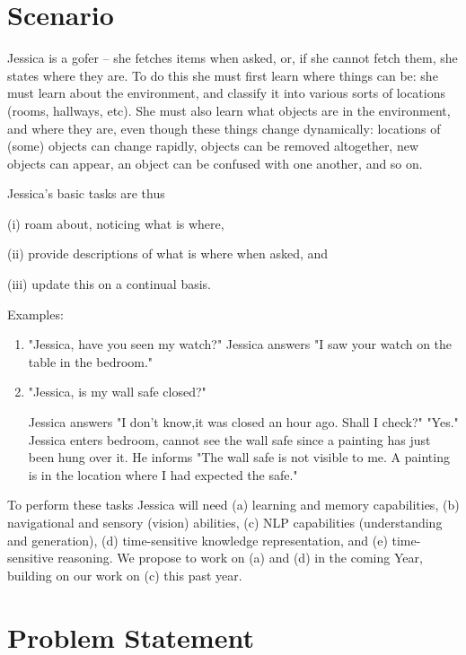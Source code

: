 \documentclass[12pt]{amsart}
\begin{document}
\section{Scenario}

Jessica is a gofer -- she fetches items when asked, or, if she
cannot fetch them, she states where they are. To do this she
must first learn where things can be: she must learn about the
environment, and classify it into various sorts of locations
(rooms, hallways, etc). She must also learn what objects are
in the environment, and where they are, even though these things
change dynamically: locations of (some) objects can change
rapidly, objects can be removed altogether, new objects can
appear, an object can be confused with one another, and so on.

Jessica's basic tasks are thus 

(i) roam about, noticing what is where,

(ii) provide descriptions of what is where when asked, and 

(iii) update this on a continual basis.

\medskip

\noindent
Examples:
\begin{enumerate}
\item
  "Jessica, have you seen my watch?" Jessica answers "I saw your watch
   on the table in the bedroom."


\item  "Jessica, is my wall safe closed?"

   Jessica answers "I don't know,it was closed an hour ago. Shall I
check?"  "Yes." Jessica enters bedroom, cannot see the wall safe since
a painting has just been hung over it. He informs "The wall safe is
not visible to me. A painting is in the location where I had expected
the safe."

\end{enumerate}

To perform these tasks Jessica will need (a) learning and memory
capabilities, (b) navigational and sensory (vision) abilities, (c) NLP
capabilities (understanding and generation), (d) time-sensitive
knowledge representation, and (e) time-sensitive reasoning. We propose
to work on (a) and (d) in the coming Year, building on our work on (c)
this past year.

\section{Problem Statement}
 
\end{document}
